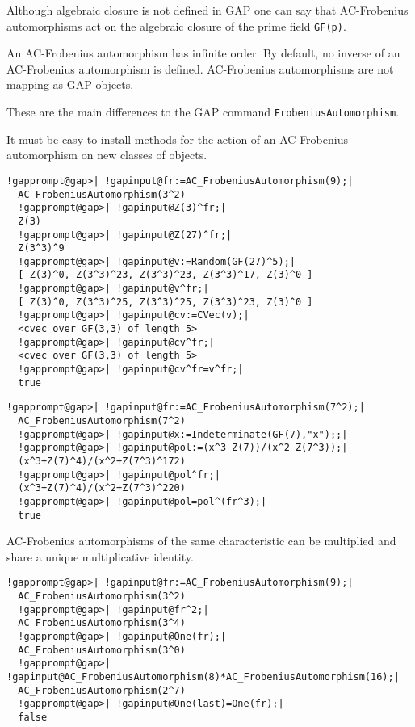 \documentclass[a4paper,11pt]{report}
\begin{document}
{{ Although algebraic closure is not defined in \textsf{GAP} one can say that AC-Frobenius automorphisms act on the algebraic closure of
the prime field \texttt{GF(p)}. 

An AC-Frobenius automorphism has infinite order. By default, no inverse of an
AC-Frobenius automorphism is defined. AC-Frobenius automorphisms are not
mapping as \textsf{GAP} objects. 

These are the main differences to the \textsf{GAP} command \texttt{FrobeniusAutomorphism}. 

It must be easy to install methods for the action of an AC-Frobenius
automorphism on new classes of objects. 
\begin{Verbatim}[commandchars=!@|,fontsize=\small,frame=single,label=Example]
  !gapprompt@gap>| !gapinput@fr:=AC_FrobeniusAutomorphism(9);|
  AC_FrobeniusAutomorphism(3^2)
  !gapprompt@gap>| !gapinput@Z(3)^fr;|
  Z(3)
  !gapprompt@gap>| !gapinput@Z(27)^fr;|
  Z(3^3)^9
  !gapprompt@gap>| !gapinput@v:=Random(GF(27)^5);|
  [ Z(3)^0, Z(3^3)^23, Z(3^3)^23, Z(3^3)^17, Z(3)^0 ]
  !gapprompt@gap>| !gapinput@v^fr;|
  [ Z(3)^0, Z(3^3)^25, Z(3^3)^25, Z(3^3)^23, Z(3)^0 ]
  !gapprompt@gap>| !gapinput@cv:=CVec(v);|
  <cvec over GF(3,3) of length 5>
  !gapprompt@gap>| !gapinput@cv^fr;|
  <cvec over GF(3,3) of length 5>
  !gapprompt@gap>| !gapinput@cv^fr=v^fr;|
  true
\end{Verbatim}
 
\begin{Verbatim}[commandchars=!@|,fontsize=\small,frame=single,label=Example]
  !gapprompt@gap>| !gapinput@fr:=AC_FrobeniusAutomorphism(7^2);|
  AC_FrobeniusAutomorphism(7^2)
  !gapprompt@gap>| !gapinput@x:=Indeterminate(GF(7),"x");;|
  !gapprompt@gap>| !gapinput@pol:=(x^3-Z(7))/(x^2-Z(7^3));|
  (x^3+Z(7)^4)/(x^2+Z(7^3)^172)
  !gapprompt@gap>| !gapinput@pol^fr;|
  (x^3+Z(7)^4)/(x^2+Z(7^3)^220)
  !gapprompt@gap>| !gapinput@pol=pol^(fr^3);|
  true
\end{Verbatim}
 AC-Frobenius automorphisms of the same characteristic can be multiplied and
share a unique multiplicative identity. 
\begin{Verbatim}[commandchars=!@|,fontsize=\small,frame=single,label=Example]
  !gapprompt@gap>| !gapinput@fr:=AC_FrobeniusAutomorphism(9);|
  AC_FrobeniusAutomorphism(3^2)
  !gapprompt@gap>| !gapinput@fr^2;|
  AC_FrobeniusAutomorphism(3^4)
  !gapprompt@gap>| !gapinput@One(fr);|
  AC_FrobeniusAutomorphism(3^0)
  !gapprompt@gap>| !gapinput@AC_FrobeniusAutomorphism(8)*AC_FrobeniusAutomorphism(16);|
  AC_FrobeniusAutomorphism(2^7)
  !gapprompt@gap>| !gapinput@One(last)=One(fr);|
  false
\end{Verbatim}
 

}}
\end{document}
